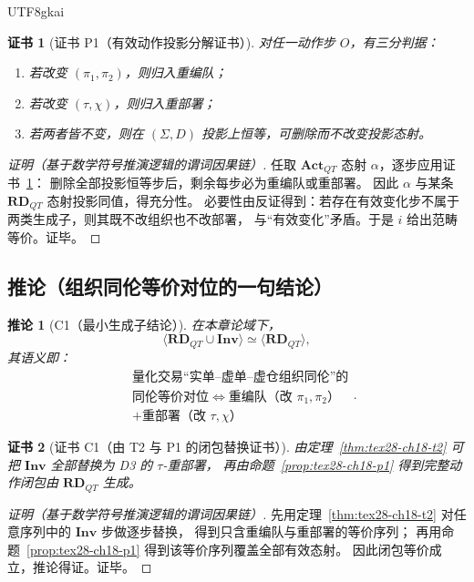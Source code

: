\documentclass[12pt]{article}
\newtheorem{corollary}{推论}[section]
\newtheorem{Certificate}{证书}[section]
\begin{document}
\begin{CJK*}{UTF8}{gkai}
\begin{Certificate}[证书 P1（有效动作投影分解证书）]
\label{cert:tex28-ch18-p1}
对任一动作步 $O$，有三分判据：
\begin{enumerate}
  \item 若改变 $(\pi_1,\pi_2)$，则归入重编队；
  \item 若改变 $(\tau,\chi)$，则归入重部署；
  \item 若两者皆不变，则在 $(\Sigma,D)$ 投影上恒等，可删除而不改变投影态射。
\end{enumerate}
\end{Certificate}

\begin{proof}[证明（基于数学符号推演逻辑的谓词因果链）]
任取 $\mathbf{Act}_{QT}$ 态射 $\alpha$，逐步应用证书~\ref{cert:tex28-ch18-p1}：
删除全部投影恒等步后，剩余每步必为重编队或重部署。
因此 $\alpha$ 与某条 $\mathbf{RD}_{QT}$ 态射投影同值，得充分性。
必要性由反证得到：若存在有效变化步不属于两类生成子，则其既不改组织也不改部署，
与“有效变化”矛盾。于是 $i$ 给出范畴等价。证毕。
\end{proof}

\subsection{推论（组织同伦等价对位的一句结论）}
\label{subsec:tex28-ch18-cor}

\begin{corollary}[C1（最小生成子结论）]
\label{cor:tex28-ch18-c1}
在本章论域下，
\[
  \langle\mathbf{RD}_{QT}\cup\mathbf{Inv}\rangle
  \simeq
  \langle\mathbf{RD}_{QT}\rangle,
\]
其语义即：
\[
  \boxed{
    \begin{aligned}
      &\text{量化交易“实单--虚单--虚仓组织同伦”的}\\
      &\text{同伦等价对位}
      \Longleftrightarrow
      \text{重编队（改 }\pi_1,\pi_2\text{）}\\
      &\text{+重部署（改 }\tau,\chi\text{）}
    \end{aligned}
  }.
\]
\end{corollary}

\begin{Certificate}[证书 C1（由 T2 与 P1 的闭包替换证书）]
\label{cert:tex28-ch18-c1}
由定理~\ref{thm:tex28-ch18-t2} 可把 $\mathbf{Inv}$ 全部替换为 D3 的 $\tau$-重部署，
再由命题~\ref{prop:tex28-ch18-p1} 得到完整动作闭包由 $\mathbf{RD}_{QT}$ 生成。
\end{Certificate}

\begin{proof}[证明（基于数学符号推演逻辑的谓词因果链）]
先用定理~\ref{thm:tex28-ch18-t2} 对任意序列中的 $\mathbf{Inv}$ 步做逐步替换，
得到只含重编队与重部署的等价序列；
再用命题~\ref{prop:tex28-ch18-p1} 得到该等价序列覆盖全部有效态射。
因此闭包等价成立，推论得证。证毕。
\end{proof}


\end{CJK*}
\end{document}
